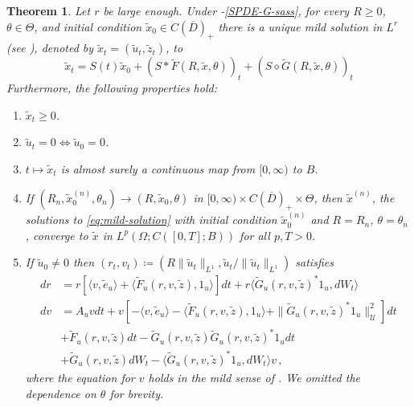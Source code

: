 \documentclass[final]{amsart}
\newtheorem{thm}{Theorem}
\numberwithin{thm}{section}
\numberwithin{equation}{section}
\newcommand{\U}{\mathcal{U}}
\newcommand{\ip}[2]{\langle #1, #2 \rangle}
\newcommand{\cdom}{C(\overline D)_+}
\begin{document}
\begin{thm}\label{bigthm}
    Let $r$ be large enough. Under -\ref{SPDE-G-sass}, for every $R \geq 0$, $\theta \in \Theta$, and initial condition $\tilde{x}_0 \in \cdom$ there is a unique mild solution in $L^r$ (see ), denoted by $\tilde{x}_t = (\tilde{u}_t, \tilde{z}_t)$, to
    \begin{equation}\label{eq:mild-solution}
        \tilde{x}_t =S(t) \tilde{x}_0 + (S * \tilde F(R,\tilde{x},\theta))_t + (S \diamond \tilde G(R, \tilde{x},\theta))_t
   \end{equation}
    Furthermore, the following properties hold:
    \begin{enumerate}[label=(\roman*)]
        \item \label{bigthm:nonneg} $\tilde{x}_t \geq 0$.
        \item \label{bigthm:invt-set} $\tilde{u}_t = 0 \iff \tilde{u}_0 = 0$.
        \item \label{bigthm:cont-in-time} $t \mapsto \tilde{x}_t$ is almost surely a continuous map from $[0,\infty)$ to $B$.
        \item \label{bigthm:cont-in-space} If $(R_n,\tilde{x}_0^{(n)},\theta_n) \to (R,\tilde{x}_0,\theta)$ in $[0,\infty) \times \cdom \times \Theta$, then $\tilde{x}^{(n)}$, the solutions to \eqref{eq:mild-solution} with initial condition $\tilde{x}_0^{(n)}$ and $R = R_n$, $\theta = \theta_n$, converge to $\tilde{x}$ in $L^p(\Omega;C([0,T];B))$ for all $p,T > 0$.
        \item \label{bigthm:drdv} If $\tilde{u}_0 \neq 0$ then $(r_t,v_t) \coloneqq (R\|\tilde{u}_t\|_{L^1}, \tilde{u}_t/\|\tilde{u}_t\|_{L^1})$ satisfies
        \begin{equation}\label{new-dr-dv}
            \begin{aligned}
            dr &= r[\ip{v}{\tilde e_u} + \ip{\tilde F_u(r,v,\tilde{z})}{1_u}]dt + r\ip{\tilde G_u(r,v,\tilde{z})^*1_u}{dW_t} \\
            dv &= A_uvdt + v[-\ip{v}{\tilde e_u} - \ip{\tilde F_u(r,v,\tilde{z})}{1_u} + \|\tilde G_u(r,v,\tilde{z})^*1_u\|_\U^2]dt \\
            &+ \tilde F_u(r,v,\tilde{z})dt - \tilde G_u(r,v,\tilde{z})\tilde G_u(r,v,\tilde{z})^*1_udt \\
            &+ \tilde G_u(r,v,\tilde{z})dW_t- \ip{\tilde G_u(r,v,\tilde{z})^*1_u}{dW_t}v \,,
        \end{aligned}
    \end{equation}
    where the equation for $v$ holds in the mild sense of . We omitted the dependence on $\theta$ for brevity.
    

\end{enumerate}
\end{thm}
\end{document}
